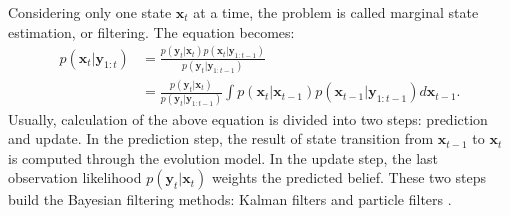 Considering only one state $\boldsymbol{x}_{t}$ at a time, the problem is called marginal state estimation, or filtering. The equation becomes:
\begin{equation}
    \label{eq:bayesfilter}
    \begin{split}
        p(\boldsymbol{x}_{t}|\boldsymbol{y}_{1:t})&=\frac{p(\boldsymbol{y}_t|\boldsymbol{x}_t)p(\boldsymbol{x}_{t}|\boldsymbol{y}_{1:t-1})}{p(\boldsymbol{y}_t|\boldsymbol{y}_{1:t-1})}\\
        &=\frac{p(\boldsymbol{y}_t|\boldsymbol{x}_t)}{p(\boldsymbol{y}_t|\boldsymbol{y}_{1:t-1})}\int p(\boldsymbol{x}_{t}|\boldsymbol{x}_{t-1})p(\boldsymbol{x}_{t-1}|\boldsymbol{y}_{1:t-1})d\boldsymbol{x}_{t-1}.
    \end{split}
\end{equation}
Usually, calculation of the above equation is divided into two steps: prediction and update. In the prediction step, the result of state transition from $\boldsymbol{x}_{t-1}$ to $\boldsymbol{x}_t$ is computed through the evolution model. In the update step, the last observation likelihood $p(\boldsymbol{y}_t|\boldsymbol{x}_t)$ weights the predicted belief. These two steps build the Bayesian filtering methods: Kalman filters and particle filters \citep{chen_bayesian_2003}.

